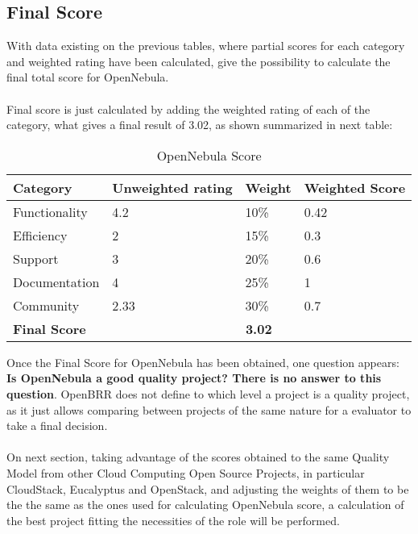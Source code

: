 \documentclass[11pt]{article}
\begin{document}
\subsection{Final Score}\label{sec:final_score}
With data existing on the previous tables, where partial scores for each category and weighted rating have been calculated, give the possibility to calculate the final total score for OpenNebula.\\
\\
Final score is just calculated by adding the weighted rating of each of the category, what gives a final result of 3.02, as shown summarized in next table:
\begin{table}[H]
  \begin{center}
    \begin{tabular}{ | p{3cm} | p{2.5cm} | p{1.5cm} | p{2cm} | }
    \toprule
    \textbf{Category} & \textbf{Unweighted rating} & \textbf{Weight} & \textbf{Weighted Score}\\
    \hline
    Functionality & 4.2 & 10\% & 0.42\\
    \hline
    Efficiency & 2 & 15\% & 0.3\\
    \hline
    Support & 3 & 20\% & 0.6\\
    \hline
    Documentation & 4 & 25\% & 1\\
    \hline
    Community & 2.33 & 30\% & 0.7\\
    \midrule
    \textbf{Final Score} & \multicolumn {3}{c|}{\textbf{3.02}}\\
    \bottomrule
    \end{tabular}
    \caption{OpenNebula Score}
    \label{tab:final_score}
  \end{center}
\end{table}
Once the Final Score for OpenNebula has been obtained, one question appears: \textbf{Is OpenNebula a good quality project? There is no answer to this question}. OpenBRR does not define to which level a project is a quality project, as it just allows comparing between projects of the same nature for a evaluator to take a final decision.\\
\\
On next section, taking advantage of the scores obtained to the same Quality Model from other Cloud Computing Open Source Projects, in particular CloudStack, Eucalyptus and OpenStack, and adjusting the weights of them to be the the same as the ones used for calculating OpenNebula score, a calculation of the best project fitting the necessities of the role will be performed.
\end{document}
